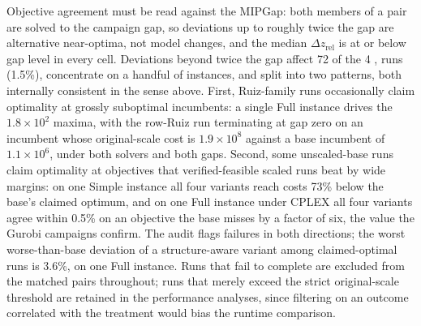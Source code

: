 \documentclass[AMA,Times1COL]{WileyNJDv5} %
\providecommand{\DIFadd}[1]{{\protect\color{blue} \sf #1}} %
\begin{document}
\DIFadd{Objective agreement must be read against the MIPGap: both members of a pair are solved
to the campaign gap, so deviations up to roughly twice the gap are alternative
near-optima, not model changes, and the median $\Delta z_{\mathrm{rel}}$ is at or below
gap level in every cell. Deviations beyond twice the gap affect 72 of the 4}{\DIFadd{,}}\DIFadd{806 runs
(1.5\%), concentrate on a handful of instances, and split into two patterns, both
internally consistent in the sense above. First, Ruiz-family runs occasionally claim
optimality at grossly suboptimal incumbents: a single Full instance drives the
$1.8\times10^{2}$ maxima, with the row-Ruiz run terminating at gap zero on an incumbent
whose original-scale cost is $1.9\times10^{8}$ against a base incumbent of
$1.1\times10^{6}$, under both solvers and both gaps. Second, some unscaled-base runs
claim optimality at objectives that verified-feasible scaled runs beat by wide margins:
on one Simple instance all four variants reach costs 73\% below the base's claimed
optimum, and on one Full instance under CPLEX all four variants agree within 0.5\% on
an objective the base misses by a factor of six, the value the Gurobi campaigns
confirm. The audit flags failures in both directions; the worst worse-than-base
deviation of a structure-aware variant among claimed-optimal runs is 3.6\%, on one Full
instance. Runs that fail to complete are excluded from the matched pairs throughout;
runs that merely exceed the strict original-scale threshold are retained in the
performance analyses, since filtering on an outcome correlated with the treatment would
bias the runtime comparison.
}
\end{document}
